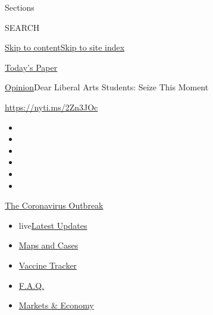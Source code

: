 Sections

SEARCH

\protect\hyperlink{site-content}{Skip to
content}\protect\hyperlink{site-index}{Skip to site index}

\href{https://myaccount.nytimes.com/auth/login?response_type=cookie\&client_id=vi}{}

\href{https://www.nytimes.com/section/todayspaper}{Today's Paper}

\href{/section/opinion}{Opinion}\textbar{}Dear Liberal Arts Students:
Seize This Moment

\href{https://nyti.ms/2Zn3JOc}{https://nyti.ms/2Zn3JOc}

\begin{itemize}
\item
\item
\item
\item
\item
\item
\end{itemize}

\href{https://www.nytimes.com/news-event/coronavirus?action=click\&pgtype=Article\&state=default\&region=TOP_BANNER\&context=storylines_menu}{The
Coronavirus Outbreak}

\begin{itemize}
\tightlist
\item
  live\href{https://www.nytimes.com/2020/08/08/world/coronavirus-updates.html?action=click\&pgtype=Article\&state=default\&region=TOP_BANNER\&context=storylines_menu}{Latest
  Updates}
\item
  \href{https://www.nytimes.com/interactive/2020/us/coronavirus-us-cases.html?action=click\&pgtype=Article\&state=default\&region=TOP_BANNER\&context=storylines_menu}{Maps
  and Cases}
\item
  \href{https://www.nytimes.com/interactive/2020/science/coronavirus-vaccine-tracker.html?action=click\&pgtype=Article\&state=default\&region=TOP_BANNER\&context=storylines_menu}{Vaccine
  Tracker}
\item
  \href{https://www.nytimes.com/interactive/2020/world/coronavirus-tips-advice.html?action=click\&pgtype=Article\&state=default\&region=TOP_BANNER\&context=storylines_menu}{F.A.Q.}
\item
  \href{https://www.nytimes.com/live/2020/08/07/business/stock-market-today-coronavirus?action=click\&pgtype=Article\&state=default\&region=TOP_BANNER\&context=storylines_menu}{Markets
  \& Economy}
\end{itemize}

